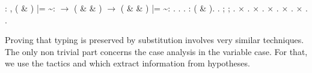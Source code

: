 \documentclass[12pt]{report}
\begin{document}
\begin{coqdoccode}
\coqdocemptyline
\coqdocnoindent
{}  : \coqdockw{\ensuremath{\forall}}     ,\coqdoceol
\coqdocindent{1.50em}
( \& ) |=  \~{}:  \ensuremath{\rightarrow} \coqdoceol
\coqdocindent{1.50em}
 ( \&  \& ) \ensuremath{\rightarrow}\coqdoceol
\coqdocindent{1.50em}
( \&  \& ) |=  \~{}: .\coqdoceol
\coqdocnoindent
{}.\coqdoceol
\coqdocindent{1.00em}
 .  : ( \& ).  .\coqdoceol
\coqdocindent{1.00em}
 ;    ; .\coqdoceol
\coqdocindent{1.00em}
\ensuremath{\times} . \ensuremath{\times} .\coqdoceol
\coqdocindent{1.00em}
\ensuremath{\times}   . \ensuremath{\times} .\coqdoceol
\coqdocindent{1.00em}
\ensuremath{\times} .\coqdoceol
\coqdocnoindent
{}.\coqdoceol
\coqdocemptyline
\end{coqdoccode}
Proving that typing is preserved by substitution involves very
    similar techniques. The only non trivial part concerns the case
    analysis in the variable case. For that, we use the tactics
     and  which extract information from
     hypotheses. 
\end{document}
